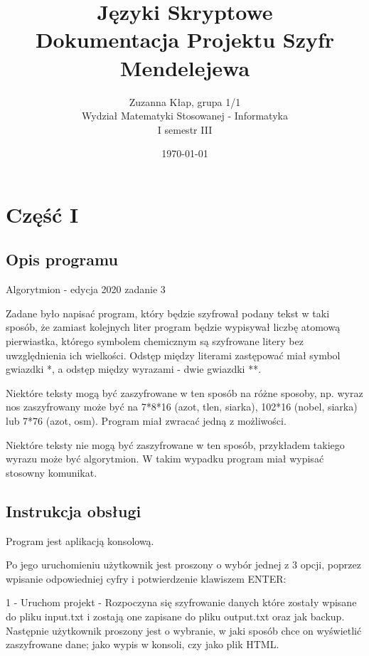 \documentclass[12pt,a4paper]{article}
\begin{document}
	
        \title{Języki Skryptowe\\\small{Dokumentacja Projektu Szyfr Mendelejewa}}
        \author{Zuzanna Kłap, grupa 1/1\\Wydział Matematyki Stosowanej - Informatyka\\I semestr III}
        \date{\today}


	\maketitle
        \newpage
	\section*{Część I}
	\subsection*{Opis programu}
	\hspace{0.5cm} Algorytmion - edycja 2020 zadanie 3 
        
        Zadane było napisać program, który będzie szyfrował podany tekst w taki sposób, że zamiast kolejnych liter program będzie wypisywał liczbę atomową pierwiastka, którego symbolem chemicznym są szyfrowane litery bez uwzględnienia ich wielkości. Odstęp między literami zastępować miał symbol gwiazdki *, a odstęp między wyrazami - dwie gwiazdki **. 

        Niektóre teksty mogą być zaszyfrowane w ten sposób na różne sposoby,
        np. wyraz nos zaszyfrowany może być na 7*8*16 (azot, tlen, siarka), 102*16 (nobel, siarka) lub 7*76 (azot, osm). Program miał zwracać jedną z możliwości.

        Niektóre teksty nie mogą być zaszyfrowane w ten sposób, przykładem
        takiego wyrazu może być algorytmion. W takim wypadku program miał wypisać stosowny komunikat.


        
	\subsection*{Instrukcja obsługi}
        \hspace{0.5cm} Program jest aplikacją konsolową.

        Po jego uruchomieniu użytkownik jest proszony o wybór jednej z 3 opcji, poprzez wpisanie odpowiedniej cyfry i potwierdzenie klawiszem ENTER:

        1 - Uruchom projekt - Rozpoczyna się szyfrowanie danych które zostały wpisane do pliku input.txt i zostają one zapisane do pliku output.txt oraz jak backup. Następnie użytkownik proszony jest o wybranie, w jaki sposób chce on wyświetlić zaszyfrowane dane; jako wypis w konsoli, czy jako plik HTML.
\end{document}
